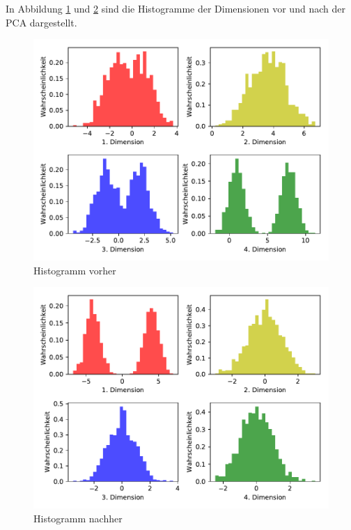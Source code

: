In Abbildung \ref{abb:3} und \ref{abb:4} sind die Histogramme der Dimensionen
vor und nach der PCA dargestellt.

\begin{figure}
  \centering
  \includegraphics[scale=0.7]{Aufgabe14/Histogramm_vorher.pdf}
  \caption{Histogramm vorher}
  \label{abb:3}
\end{figure}
\begin{figure}
  \centering
  \includegraphics[scale=0.7]{Aufgabe14/Histogramm.pdf}
  \caption{Histogramm nachher}
  \label{abb:4}
\end{figure}

